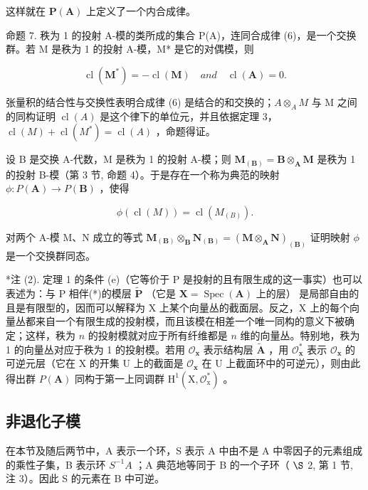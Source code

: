 这样就在 \(\pmb{P}(\mathbf{A})\) 上定义了一个内合成律。

命题 7. 秩为 1 的投射 A-模的类所成的集合 P(A)，连同合成律 (6)，是一个交换群。若 M 是秩为 1 的投射 A-模，M* 是它的对偶模，则

\[
\operatorname{cl} (\mathbf {M} ^ {*}) = - \operatorname{cl} (\mathbf {M}) \quad a n d \quad \operatorname{cl} (\mathbf {A}) = 0.\tag{7}
\]

张量积的结合性与交换性表明合成律 (6) 是结合的和交换的；\(A \otimes_{A} M\) 与 M 之间的同构证明 \(\operatorname{cl}(A)\) 是这个律下的单位元，并且依据定理 3，\(\operatorname{cl}(M) + \operatorname{cl}(M^{*}) = \operatorname{cl}(A)\) ，命题得证。

设 B 是交换 A-代数，M 是秩为 1 的投射 A-模；则 \(\mathbf{M}_{(\mathbf{B})} = \mathbf{B} \otimes_{\mathbf{A}} \mathbf{M}\) 是秩为 1 的投射 B-模（第 3 节, 命题 4）。于是存在一个称为典范的映射 \(\phi: P(\mathbf{A}) \to P(\mathbf{B})\) ，使得

\[
\phi (\operatorname{cl} (M)) = \operatorname{cl} (M _ {(B)}).\tag{8}
\]

对两个 A-模 M、N 成立的等式 \(\mathbf{M}_{(\mathbf{B})}\otimes_{\mathbf{B}}\mathbf{N}_{(\mathbf{B})}=(\mathbf{M}\otimes_{\mathbf{A}}\mathbf{N})_{(\mathbf{B})}\) 证明映射 \(\phi\) 是一个交换群同态。

*注 (2). 定理 1 的条件 (e)（它等价于 P 是投射的且有限生成的这一事实）也可以表述为：与 P 相伴(*)的模层 \(\tilde{\mathbf{P}}\) （它是 \(\mathbf{X} = \operatorname{Spec}(\mathbf{A})\) 上的层） 是局部自由的且是有限型的，因而可以解释为 X 上某个向量丛的截面层。反之，X 上的每个向量丛都来自一个有限生成的投射模，而且该模在相差一个唯一同构的意义下被确定；这样，秩为 \(n\) 的投射模就对应于所有纤维都是 \(n\) 维的向量丛。特别地，秩为 1 的向量丛对应于秩为 1 的投射模。若用 \(\mathcal{O}_{\mathbf{x}}\) 表示结构层 \(\tilde{\mathbf{A}}\) ，用 \(\mathcal{O}_{\mathbf{x}}^{*}\) 表示 \(\mathcal{O}_{\mathbf{x}}\) 的可逆元层（它在 X 的开集 U 上的截面是 \(\mathcal{O}_{\mathbf{x}}\) 在 U 上截面环中的可逆元），则由此得出群 \(P(\mathbf{A})\) 同构于第一上同调群 \(\mathrm{H}^1 (\mathrm{X},\mathcal{O}_\mathrm{x}^*)\) 。

\subsection{非退化子模}

在本节及随后两节中，A 表示一个环，S 表示 A 中由不是 A 中零因子的元素组成的乘性子集，B 表示环 \(S^{-1}A\) ；A 典范地等同于 B 的一个子环（ \(\S\) 2, 第 1 节, 注 3）。因此 S 的元素在 B 中可逆。

